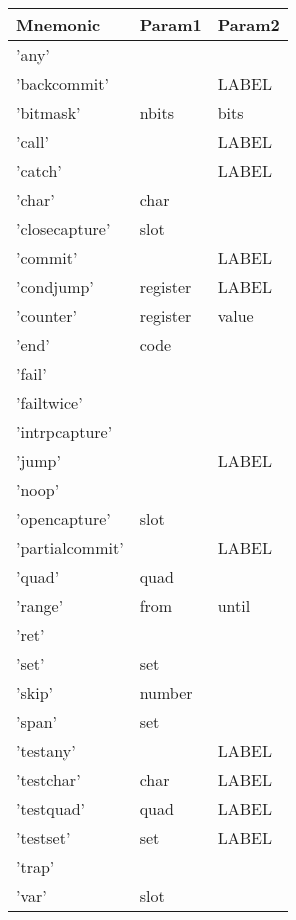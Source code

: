 
\begin{center}
\label{tab:naig_assembly}
\begin{longtable}{lll}
\textbf{Mnemonic} & \textbf{Param1} & \textbf{Param2} \\
\endhead
'any' &  &  \\
'backcommit' &  & LABEL \\
'bitmask' & nbits & bits \\
'call' &  & LABEL \\
'catch' &  & LABEL \\
'char' & char &  \\
'closecapture' & slot &  \\
'commit' &  & LABEL \\
'condjump' & register & LABEL \\
'counter' & register & value \\
'end' & code &  \\
'fail' &  &  \\
'failtwice' &  &  \\
'intrpcapture' &  &  \\
'jump' &  & LABEL \\
'noop' &  &  \\
'opencapture' & slot &  \\
'partialcommit' &  & LABEL \\
'quad' & quad &  \\
'range' & from & until \\
'ret' &  &  \\
'set' & set &  \\
'skip' & number &  \\
'span' & set &  \\
'testany' &  & LABEL \\
'testchar' & char & LABEL \\
'testquad' & quad & LABEL \\
'testset' & set & LABEL \\
'trap' &  &  \\
'var' & slot &  \\
\end{longtable}
\end{center}
